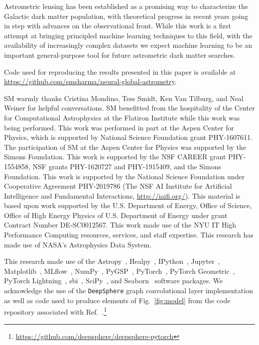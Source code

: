 \documentclass[preprint]{article}
\begin{document}
Astrometric lensing has been established as a promising way to characterize the Galactic dark matter population, with theoretical progress in recent years going in step with advances on the observational front. While this work is a first attempt at bringing principled machine learning techniques to this field, with the availability of increasingly complex datasets we expect machine learning to be an important general-purpose tool for future astrometric dark matter searches.

Code used for reproducing the results presented in this paper is available at \url{https://github.com/smsharma/neural-global-astrometry}. 

\begin{ack}
SM warmly thanks Cristina Mondino, Tess Smidt, Ken Van Tilburg, and Neal Weiner for helpful conversations. SM benefitted from the hospitality of the Center for Computational Astrophysics at the Flatiron Institute while this work was being performed. 
This work was performed in part at the Aspen Center for Physics, which is supported by National Science Foundation grant PHY-1607611.
The participation of SM at the Aspen Center for Physics was supported by the Simons Foundation.
This work is supported by the NSF CAREER grant PHY-1554858, NSF grants PHY-1620727 and PHY-1915409, and the Simons Foundation. 
This work is supported by the National Science Foundation under Cooperative Agreement PHY-2019786 (The NSF AI Institute for Artificial Intelligence and Fundamental Interactions, \url{http://iaifi.org/}).
This material is based upon work supported by the U.S. Department of Energy, Office of Science, Office of High Energy Physics of U.S. Department of Energy under grant Contract Number DE-SC0012567.
This work made use of the NYU IT High Performance Computing resources, services, and staff expertise. 
This research has made use of NASA's Astrophysics Data System. 

This research made use of the Astropy~\cite{Robitaille:2013mpa,Price-Whelan:2018hus},
Healpy~\cite{Gorski:2004by,Zonca2019},
IPython~\cite{PER-GRA:2007},
Jupyter~\cite{Kluyver2016JupyterN},
Matplotlib~\cite{Hunter:2007},
MLflow~\cite{chen2020developments},
NumPy~\cite{harris_array_2020},
PyGSP~\cite{michael_defferrard_2017_1003158},
PyTorch~\cite{NEURIPS2019_9015},
PyTorch Geometric~\cite{Fey/Lenssen/2019}, 
PyTorch Lightning~\cite{william_falcon_2020_3828935},
sbi~\cite{tejero-cantero2020sbi},
SciPy~\cite{2020SciPy-NMeth}, and
Seaborn~\cite{michael_waskom_2017_883859}
software packages.
We acknowledge the use of the \texttt{DeepSphere} graph convolutional layer implementation as well as code used to produce elements of Fig.~\ref{fig:model} from the code repository associated with Ref.~\cite{defferrard2020deepsphere}.\footnote{\url{https://github.com/deepsphere/deepsphere-pytorch}}
\end{ack}
\end{document}
